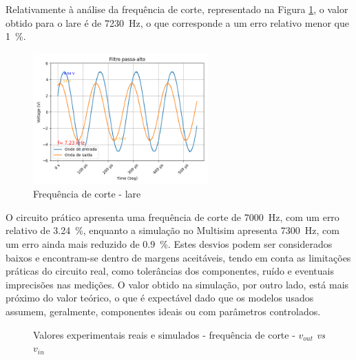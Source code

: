 Relativamente à análise da frequência de corte, representado na Figura \ref{fig:fcvoutlare}, o valor obtido para o \acrshort{lare} é de \SI{7230}{\hertz}, o que corresponde a um erro relativo menor que \SI{1}{\percent}.

\begin{figure}[hbtp]
	\centering
	\includegraphics[width=0.6\textwidth]{figures/filtro_passa-alto_fc_LaRE.png}
	\caption{Frequência de corte - \acrshort{lare}}
	\label{fig:fcvoutlare}
\end{figure}

O circuito prático apresenta uma frequência de corte de \SI{7000}{\hertz}, com um erro relativo de \SI{3.24}{\percent}, enquanto a simulação no Multisim apresenta \SI{7300}{\hertz}, com um erro ainda mais reduzido de \SI{0.9}{\percent}. Estes desvios podem ser considerados baixos e encontram-se dentro de margens aceitáveis, tendo em conta as limitações práticas do circuito real, como tolerâncias dos componentes, ruído e eventuais imprecisões nas medições. O valor obtido na simulação, por outro lado, está mais próximo do valor teórico, o que é expectável dado que os modelos usados assumem, geralmente, componentes ideais ou com parâmetros controlados.

\begin{figure}[hbtp]
	\centering%
		\centering
		\qquad
		\caption{Valores experimentais reais e simulados - frequência de corte - $v_{out}$ \textit{vs} $v_{in}$}%
		\label{fig:simulacaovout}%
	\end{figure}